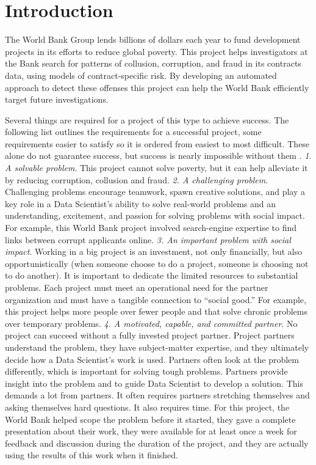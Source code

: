 \chapter{Introduction}\label{chap_intro}

The World Bank Group lends billions of dollars each year to fund development projects in its efforts to reduce global poverty. This project helps investigators at the Bank search for patterns of collusion, corruption, and fraud in its contracts data, using models of contract-specific risk. By developing an automated approach to detect these offenses this project can help the World Bank efficiently target future investigations.

Several things are required for a project of this type to achieve success. The following list outlines the requirements for a successful project, some requirements easier to satisfy so it is ordered from easiest to most difficult. These alone do not guarantee success, but success is nearly impossible without them \parencite{dssg_proj_list}.   \textit{1. A solvable problem}. This project cannot solve poverty, but it can help alleviate it by reducing corruption, collusion and fraud. 
\textit{2. A challenging problem}. Challenging problems encourage teamwork, spawn creative solutions, and play a key role in a Data Scientist's ability to solve real-world problems and an understanding, excitement, and passion for solving problems with social impact. For example, this World Bank project involved  search-engine expertise to find links between corrupt applicants online. 
\textit{3. An important problem with social impact}. Working in a big project is an investment, not only financially, but also opportunistically (when someone choose to do a project, someone is choosing not to do another). It is important to dedicate the limited resources to substantial problems. Each project must meet an operational need for the partner organization and must have a tangible connection to ``social good.'' For example, this project helps more people over fewer people and that solve chronic problems over temporary problems. 
\textit{4. A motivated, capable, and committed partner}. No project can succeed without a fully invested project partner. Project partners understand the problem, they have subject-matter expertise, and they ultimately decide how a Data Scientist's work is used. Partners often look at the problem differently, which is important for solving tough problems.  Partners provide insight into the problem and to guide Data Scientist to develop a solution. This demands a lot from partners. It often requires partners stretching themselves and asking themselves hard questions. It also requires time. For this project, the World Bank helped scope the problem before it started, they gave a complete presentation about their work, they were available for at least once a week for feedback and discussion during the duration of the project, and they are actually using the results of this work when it finished. 
